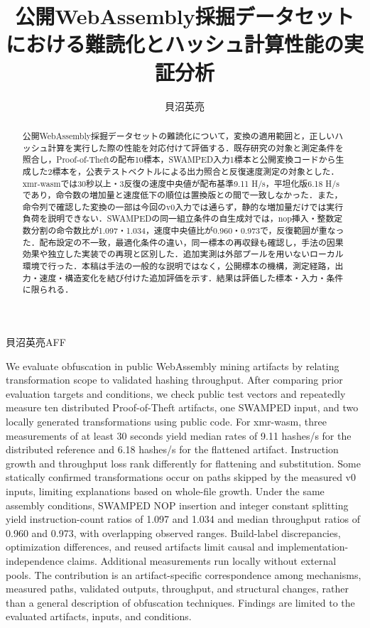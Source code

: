 \documentclass[submit,techrep]{ipsj}
\begin{document}
\title{公開WebAssembly採掘データセットにおける難読化とハッシュ計算性能の実証分析}
\author{貝沼英亮}{貝沼英亮}{AFF}
\begin{abstract}
公開WebAssembly採掘データセットの難読化について，変換の適用範囲と，正しいハッシュ計算を実行した際の性能を対応付けて評価する．既存研究の対象と測定条件を照合し，Proof-of-Theftの配布10標本，SWAMPED入力1標本と公開変換コードから生成した2標本を，公表テストベクトルによる出力照合と反復速度測定の対象とした．xmr-wasmでは30秒以上・3反復の速度中央値が配布基準9.11 H/s，平坦化版6.18 H/sであり，命令数の増加量と速度低下の順位は置換版との間で一致しなかった．また，命令列で確認した変換の一部は今回のv0入力では通らず，静的な増加量だけでは実行負荷を説明できない．SWAMPEDの同一組立条件の自生成対では，nop挿入・整数定数分割の命令数比が1.097・1.034，速度中央値比が0.960・0.973で，反復範囲が重なった．配布設定の不一致，最適化条件の違い，同一標本の再収録も確認し，手法の因果効果や独立した実装での再現と区別した．追加実測は外部プールを用いないローカル環境で行った．本稿は手法の一般的な説明ではなく，公開標本の機構，測定経路，出力・速度・構造変化を結び付けた追加評価を示す．結果は評価した標本・入力・条件に限られる．
\end{abstract}
\begin{eabstract}
We evaluate obfuscation in public WebAssembly mining artifacts by relating transformation scope to validated hashing throughput. After comparing prior evaluation targets and conditions, we check public test vectors and repeatedly measure ten distributed Proof-of-Theft artifacts, one SWAMPED input, and two locally generated transformations using public code. For xmr-wasm, three measurements of at least 30 seconds yield median rates of 9.11 hashes/s for the distributed reference and 6.18 hashes/s for the flattened artifact. Instruction growth and throughput loss rank differently for flattening and substitution. Some statically confirmed transformations occur on paths skipped by the measured v0 inputs, limiting explanations based on whole-file growth. Under the same assembly conditions, SWAMPED NOP insertion and integer constant splitting yield instruction-count ratios of 1.097 and 1.034 and median throughput ratios of 0.960 and 0.973, with overlapping observed ranges. Build-label discrepancies, optimization differences, and reused artifacts limit causal and implementation-independence claims. Additional measurements run locally without external pools. The contribution is an artifact-specific correspondence among mechanisms, measured paths, validated outputs, throughput, and structural changes, rather than a general description of obfuscation techniques. Findings are limited to the evaluated artifacts, inputs, and conditions.
\end{eabstract}
\maketitle
\end{document}
